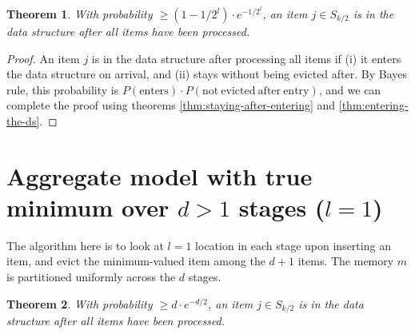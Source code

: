 \documentclass[10pt]{article}
\newtheorem{theorem}{Theorem}[section]
\begin{document}
\begin{theorem}
  \label{thm:aggregate-d1}
  With probability $\geq (1 - 1/2^l) \cdot e^{-1/2^l}$, an item $j \in S_{k/2}$ is
  in the data structure after all items have been processed.
\end{theorem}
\begin{proof}
An item $j$ is in the data structure after processing all items if (i) it enters
the data structure on arrival, and (ii) stays without being evicted after. By
Bayes rule, this probability is $P(\mathrm{enters}) \cdot
P(\mathrm{not\ evicted\ after\ entry})$, and we can complete the proof using
theorems \ref{thm:staying-after-entering} and \ref{thm:entering-the-ds}.
\end{proof}

\section{Aggregate model with true minimum over $d > 1$ stages ($l=1$)}

The algorithm here is to look at $l=1$ location in each stage upon inserting an
item, and evict the minimum-valued item among the $d+1$ items. The memory $m$ is
partitioned uniformly across the $d$ stages.

\begin{theorem}
  With probability $\geq d \cdot e^{-d/2}$, an item $j \in S_{k/2}$ is in the
  data structure after all items have been processed.
\end{theorem}
\end{document}
